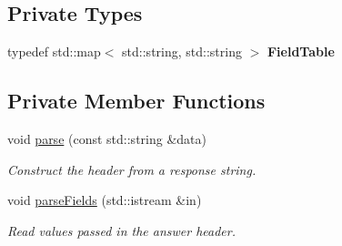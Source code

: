 \subsection*{Private Types}
\begin{DoxyCompactItemize}
\item 
\mbox{\label{classsf_1_1_http_1_1_response_af5d44ad22fb2e643522c7057bc1b55ee}} 
typedef std\+::map$<$ std\+::string, std\+::string $>$ {\bfseries Field\+Table}
\end{DoxyCompactItemize}
\subsection*{Private Member Functions}
\begin{DoxyCompactItemize}
\item 
void \mbox{\hyperlink{classsf_1_1_http_1_1_response_aeba90e07eedc362c460590f5e11b9fb2}{parse}} (const std\+::string \&data)
\begin{DoxyCompactList}\small\item\em Construct the header from a response string. \end{DoxyCompactList}\item 
void \mbox{\hyperlink{classsf_1_1_http_1_1_response_a545515d6e68a5ce179e522aad427c7ef}{parse\+Fields}} (std\+::istream \&in)
\begin{DoxyCompactList}\small\item\em Read values passed in the answer header. \end{DoxyCompactList}\end{DoxyCompactItemize}
